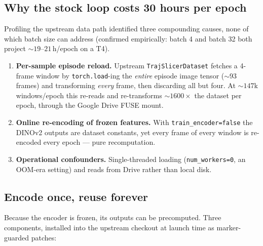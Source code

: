 \documentclass[11pt,a4paper]{article}
\begin{document}
\subsection{Why the stock loop costs 30 hours per epoch}

Profiling the upstream data path identified three compounding causes, none of
which batch size can address (confirmed empirically: batch 4 and batch 32 both
project ${\sim}19$--$21$\,h/epoch on a T4).

\begin{enumerate}[leftmargin=1.4em]
  \item \textbf{Per-sample episode reload.} Upstream
        \texttt{TrajSlicerDataset} fetches a 4-frame window by
        \texttt{torch.load}-ing the \emph{entire} episode image tensor
        ($\sim$93 frames) and transforming \emph{every} frame, then discarding
        all but four. At ${\sim}147$k windows/epoch this re-reads and
        re-transforms ${\sim}1600\times$ the dataset per epoch, through the
        Google Drive FUSE mount.
  \item \textbf{Online re-encoding of frozen features.} With
        \texttt{train\_encoder=false} the DINOv2 outputs are dataset
        constants, yet every frame of every window is re-encoded every epoch
        --- pure recomputation.
  \item \textbf{Operational confounders.} Single-threaded loading
        (\texttt{num\_workers=0}, an OOM-era setting) and reads from Drive
        rather than local disk.
\end{enumerate}

\subsection{Encode once, reuse forever}

Because the encoder is frozen, its outputs can be precomputed. Three
components, installed into the upstream checkout at launch time as
marker-guarded patches:
\end{document}
